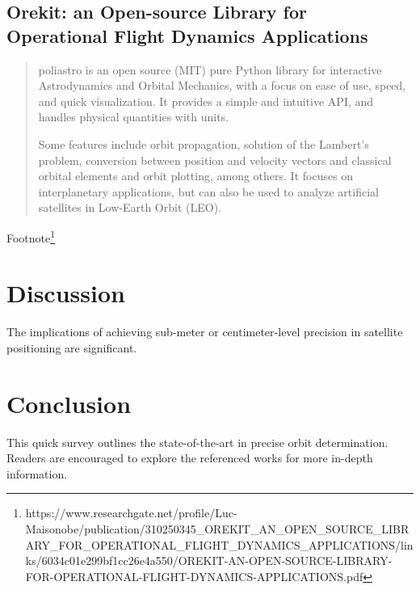 \documentclass[a4paper,10pt]{article}
\begin{document}
\subsection{Orekit: an Open-source Library for Operational Flight Dynamics Applications}
\begin{quotation}
poliastro is an open source (MIT) pure Python library for interactive Astrodynamics and Orbital Mechanics, with a focus on ease of use, speed, and quick visualization. It provides a simple and intuitive API, and handles physical quantities with units.

Some features include orbit propagation, solution of the Lambert's problem, conversion between position and velocity vectors and classical orbital elements and orbit plotting, among others. It focuses on interplanetary applications, but can also be used to analyze artificial satellites in Low-Earth Orbit (LEO).
\end{quotation}

Footnote\footnote{https://www.researchgate.net/profile/Luc-Maisonobe/publication/310250345\_OREKIT\_AN\_OPEN\_SOURCE\_LIBRARY\_FOR\_OPERATIONAL\_FLIGHT\_DYNAMICS\_APPLICATIONS/links/6034c01e299bf1cc26e4a550/OREKIT-AN-OPEN-SOURCE-LIBRARY-FOR-OPERATIONAL-FLIGHT-DYNAMICS-APPLICATIONS.pdf}

\section{Discussion}
The implications of achieving sub-meter or centimeter-level precision in satellite positioning are significant.

\section{Conclusion}
This quick survey outlines the state-of-the-art in precise orbit determination. Readers are encouraged to explore the referenced works for more in-depth information.

\newpage
\nocite{*} %
\printbibliography
\end{document}

